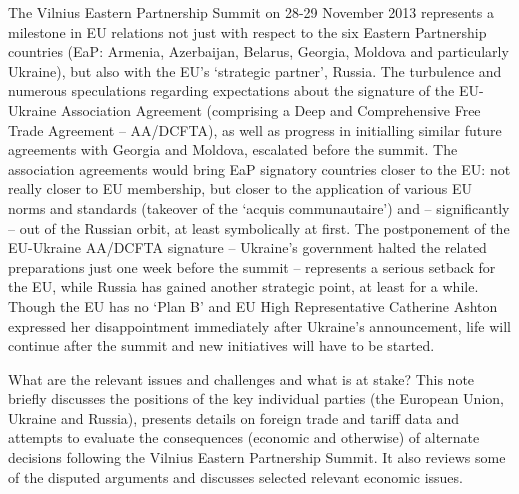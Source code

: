 The Vilnius Eastern Partnership Summit on 28-29 November 2013 represents a milestone in EU relations not just with respect to the six Eastern Partnership countries (EaP: Armenia, Azerbaijan, Belarus, Georgia, Moldova and particularly Ukraine), but also with the EU's `strategic partner', Russia. The turbulence and numerous speculations regarding expectations about the signature of the EU-Ukraine Association Agreement (comprising a Deep and Comprehensive Free Trade Agreement -- AA/DCFTA), as well as progress in initialling similar future agreements with Georgia and Moldova, escalated before the summit. The association agreements would bring EaP signatory countries closer to the EU: not really closer to EU membership, but closer to the application of various EU norms and standards (takeover of the `acquis communautaire') and -- significantly -- out of the Russian orbit, at least symbolically at first. The postponement of the EU-Ukraine AA/DCFTA signature -- Ukraine's government halted the related preparations just one week before the summit -- represents a serious setback for the EU, while Russia has gained another strategic point, at least for a while. Though the EU has no `Plan B' and EU High Representative Catherine Ashton expressed her disappointment immediately after Ukraine's announcement, life will continue after the summit and new initiatives will have to be started. 

What are the relevant issues and challenges and what is at stake? This note briefly discusses the positions of the key individual parties (the European Union, Ukraine and Russia), presents details on foreign trade and tariff data  and attempts to evaluate the consequences (economic and otherwise) of alternate decisions following the Vilnius Eastern Partnership Summit. It also reviews some of the disputed arguments and discusses selected relevant economic issues.

